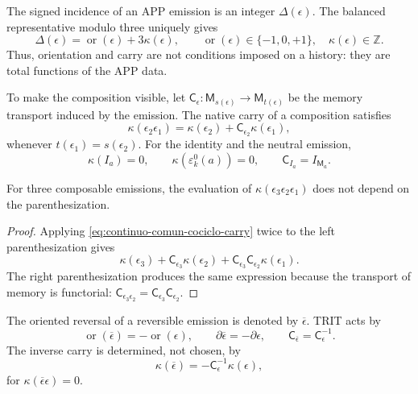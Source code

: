 The signed incidence of an APP emission is an integer
\(\Delta(\epsilon)\). The balanced representative modulo three uniquely
gives
\begin{equation}
\label{eq:continuo-comun-trit-euclid}
 \Delta(\epsilon)
 =\operatorname{or}(\epsilon)+3\kappa(\epsilon),
 \qquad
 \operatorname{or}(\epsilon)\in\{-1,0,+1\},
 \quad
 \kappa(\epsilon)\in\mathbb Z.
\end{equation}
Thus, orientation and carry are not conditions imposed on a history:
they are total functions of the APP data.

To make the composition visible, let
\(\mathsf C_{\epsilon}:\mathsf M_{s(\epsilon)}\to
\mathsf M_{t(\epsilon)}\) be the memory transport induced by the emission.
The native carry of a composition satisfies
\begin{equation}
\label{eq:continuo-comun-cociclo-carry}
 \kappa(\epsilon_2\epsilon_1)
 =\kappa(\epsilon_2)
  +\mathsf C_{\epsilon_2}\kappa(\epsilon_1),
\end{equation}
whenever \(t(\epsilon_1)=s(\epsilon_2)\). For the identity and the neutral emission,
\begin{equation}
\label{eq:continuo-comun-carry-unidad}
 \kappa(I_a)=0,
 \qquad
 \kappa(\varepsilon^0_k(a))=0,
 \qquad
 \mathsf C_{I_a}=I_{\mathsf M_a}.
\end{equation}

\begin{lemma}
\label{lem:continuo-comun-asociatividad-carry}
For three composable emissions, the evaluation of
\(\kappa(\epsilon_3\epsilon_2\epsilon_1)\) does not depend on the parenthesization.
\end{lemma}

\begin{proof}
Applying \eqref{eq:continuo-comun-cociclo-carry} twice to the left
parenthesization gives
\[
 \kappa(\epsilon_3)
 +\mathsf C_{\epsilon_3}\kappa(\epsilon_2)
 +\mathsf C_{\epsilon_3}\mathsf C_{\epsilon_2}
  \kappa(\epsilon_1).
\]
The right parenthesization produces the same expression because the transport of
memory is functorial:
\(\mathsf C_{\epsilon_3\epsilon_2}
=\mathsf C_{\epsilon_3}\mathsf C_{\epsilon_2}\).
\end{proof}

The oriented reversal of a reversible emission is denoted by
\(\overline\epsilon\).  TRIT acts by
\begin{equation}
\label{eq:continuo-comun-reversion-trit}
 \operatorname{or}(\overline\epsilon)
 =-\operatorname{or}(\epsilon),
 \qquad
 \partial\overline\epsilon=-\partial\epsilon,
 \qquad
 \mathsf C_{\overline\epsilon}=\mathsf C_\epsilon^{-1}.
\end{equation}
The inverse carry is determined, not chosen, by
\begin{equation}
\label{eq:continuo-comun-carry-inverso}
 \kappa(\overline\epsilon)
 =-\mathsf C_\epsilon^{-1}\kappa(\epsilon),
\end{equation}
for \(\kappa(\overline\epsilon\epsilon)=0\).

